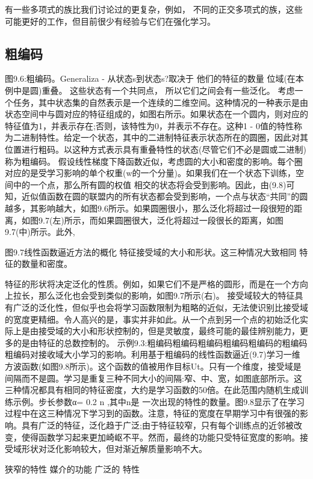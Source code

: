 {有一些多项式的族比我们讨论过的更复杂，例如，
不同的正交多项式的族，这些可能更好的工作，但目前很少有经验与它们在强化学习。
\subsection{粗编码}

图9.6:粗编码。Generaliza -
从状态s到状态s?取决于
他们的特征的数量
位域(在本例中是圆)重叠。
这些状态有一个共同点，
所以它们之间会有一些泛化。
考虑一个任务，其中状态集的自然表示是一个连续的二维空间。这种情况的一种表示是由状态空间中与圆对应的特征组成的，如图右所示。如果状态在一个圆内，则对应的特征值为1，并表示存在;否则，该特性为0，并表示不存在。这种1 - 0值的特性称为二进制特性。给定一个状态，其中的二进制特征表示状态所在的圆圈，因此对其位置进行粗码。以这种方式表示具有重叠特性的状态(尽管它们不必是圆或二进制)称为粗编码。
假设线性梯度下降函数近似，考虑圆的大小和密度的影响。每个圈对应的是受学习影响的单个权重(w的一个分量)。如果我们在一个状态下训练，空间中的一个点，那么所有圆的权值
相交的状态将会受到影响。因此，由(9.8)可知，近似值函数在圆的联盟内的所有状态都会受到影响，一个点与状态“共同”的圆越多，其影响越大，如图9.6所示。如果圆圈很小，那么泛化将超过一段很短的距离，如图9.7(左)所示，而如果圆圈很大，泛化将超过一段很长的距离，如图9.7(中)所示。此外,
 

图9.7线性函数逼近方法的概化
特征接受域的大小和形状。这三种情况大致相同
特征的数量和密度。

特征的形状将决定泛化的性质。例如，如果它们不是严格的圆形，而是在一个方向上拉长，那么泛化也会受到类似的影响，如图9.7所示(右)。
接受域较大的特征具有广泛的泛化性，但似乎也会将学习函数限制为粗略的近似，无法使识别比接受域的宽度更精细。令人高兴的是，事实并非如此。从一个点到另一个点的初始泛化实际上是由接受域的大小和形状控制的，但是灵敏度，最终可能的最佳辨别能力，更多的是由特征的总数控制的。
示例9.3:粗编码粗编码粗编码粗编码粗编码的粗编码粗编码对接收域大小学习的影响。利用基于粗编码的线性函数逼近(9.7)学习一维方波函数(如图9.8所示)。这个函数的值被用作目标Ut。只有一个维度，接受域是间隔而不是圆。学习是重复三种不同大小的间隔:窄、中、宽，如图底部所示。这三种情况都具有相同的特征密度，大约是学习函数的50倍。在此范围内随机生成训练示例。步长参数α= 0.2
n
,其中n是
一次出现的特性的数量。图9.8显示了在学习过程中在这三种情况下学习到的函数。注意，特征的宽度在早期学习中有很强的影响。具有广泛的特征，泛化趋于广泛;由于特征较窄，只有每个训练点的近邻被改变，使得函数学习起来更加崎岖不平。然而，最终的功能只受特征宽度的影响。接受域形状对泛化影响较大，但对渐近解质量影响不大。
 
狭窄的特性
媒介的功能
广泛的
特性


}
